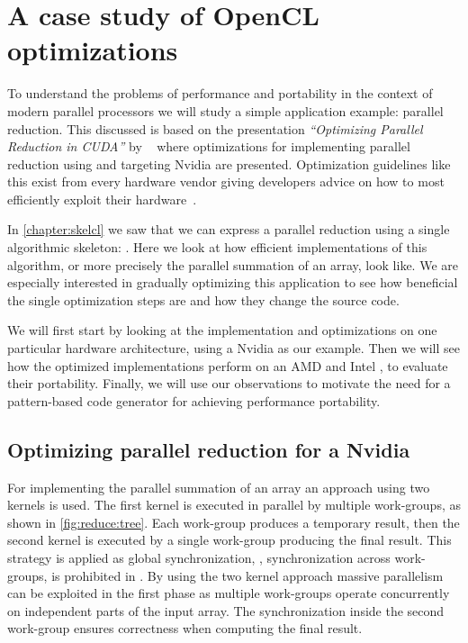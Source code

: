 \section{A case study of OpenCL optimizations}
\label{sec:reduce:case-study}
\label{section:reduce:case-study}
To understand the problems of performance and portability in the context of modern parallel processors we will study a simple application example: parallel reduction.
This discussed is based on the presentation \emph{``Optimizing Parallel Reduction in CUDA''} by \citeauthor{Harris2007}~\cite{Harris2007} where optimizations for implementing parallel reduction using \CUDA and targeting Nvidia \GPUs are presented.
Optimization guidelines like this exist from every hardware vendor giving developers advice on how to most efficiently exploit their hardware~\cite{CUDAProgrammingGuide,AMDProgrammingGuide,IntelGPUProgrammingGuide,IntelXeonProgrammingGuide}.

In \autoref{chapter:skelcl} we saw that we can express a parallel reduction using a single algorithmic skeleton: \reduce.
Here we look at how efficient \OpenCL implementations of this algorithm, or more precisely the parallel summation of an array, look like.
We are especially interested in gradually optimizing this application to see how beneficial the single optimization steps are and how they change the source code.

We will first start by looking at the implementation and optimizations on one particular hardware architecture, using a Nvidia \GPU as our example.
Then we will see how the optimized implementations perform on an AMD \GPU and Intel \CPU, to evaluate their portability.
Finally, we will use our observations to motivate the need for a pattern-based code generator for achieving performance portability.


\subsection{Optimizing parallel reduction for a Nvidia \GPU}
For implementing the parallel summation of an array an approach using two \OpenCL kernels is used.
The first \OpenCL kernel is executed in parallel by multiple \OpenCL work-groups, as shown in \autoref{fig:reduce:tree}.
Each work-group produces a temporary result, then the second \OpenCL kernel is executed by a single \OpenCL work-group producing the final result.
This strategy is applied as global synchronization, \ie, synchronization across work-groups, is prohibited in \OpenCL.
By using the two kernel approach massive parallelism can be exploited in the first phase as multiple work-groups operate concurrently on independent parts of the input array.
The synchronization inside the second work-group ensures correctness when computing the final result.

